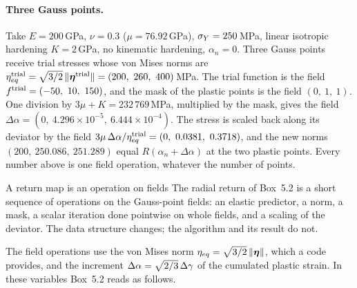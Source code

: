 \paragraph{Three Gauss points.}
Take $E=200$\,GPa, $\nu=0.3$ ($\mu=76.92$\,GPa), $\sigma_{Y}=250$\,MPa, linear
isotropic hardening $K=2$\,GPa, no kinematic hardening, $\alpha_n=0$. Three
Gauss points receive trial stresses whose von Mises norms are
$\eta_{eq}^\trial=\sqrt{3/2}\,\norm{\teta^\trial}=(200,\ 260,\ 400)$\,MPa.
The trial function is the field $f^{\mathrm{trial}}=(-50,\ 10,\ 150)$, and the mask of the
plastic points is the field $(0,\ 1,\ 1)$. One division by $3\mu+K=232\,769$\,MPa,
multiplied by the mask, gives the field
$\Delta\alpha=(0,\ 4.296\times10^{-5},\ 6.444\times10^{-4})$. The stress is
scaled back along its deviator by the field $3\mu\,\Delta\alpha/\eta_{eq}^{\mathrm{trial}}
=(0,\ 0.0381,\ 0.3718)$, and the new norms $(200,\ 250.086,\ 251.289)$ equal
$R(\alpha_n+\Delta\alpha)$ at the two plastic points. Every number above is one
field operation, whatever the number of points.

\begin{gbox}{A return map is an operation on fields}\label{thm:pn-fields}
The radial return of Box~5.2 is a short sequence of operations on the
Gauss-point fields: an elastic predictor, a norm, a mask, a scalar iteration
done pointwise on whole fields, and a scaling of the deviator. The data
structure changes; the algorithm and its result do not.
\end{gbox}

\noindent The field operations use the von Mises norm
$\eta_{eq}=\sqrt{3/2}\,\lVert \bm{\eta}\rVert$, which a code provides, and the increment
$\Delta\alpha=\sqrt{2/3}\,\Delta\gamma$ of the cumulated plastic strain. In these
variables Box~5.2 reads as follows.

